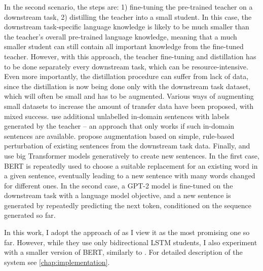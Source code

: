 \documentclass[bsc,frontabs,twoside,singlespacing,parskip,deptreport]{infthesis}
\begin{document}
{{{      In the second scenario, the steps are: 1) fine-tuning the pre-trained teacher on a downstream task, 2) distilling the teacher into a small student. 
      In this case, the downstream task-specific language knowledge is likely to be much smaller than the teacher's overall pre-trained language knowledge, meaning that a much smaller student can still contain all important knowledge from the fine-tuned teacher. 
      However, with this approach, the teacher fine-tuning and distillation has to be done separately every downstream task, which can be resource-intensive.
      Even more importantly, the distillation procedure can suffer from lack of data, since the distillation is now being done only with the downstream task dataset, which will often be small and has to be augmented.
      Various ways of augmenting small datasets to increase the amount of transfer data have been proposed, with mixed success. 
      \citet{Mukherjee_2019} use additional unlabelled in-domain sentences with labels generated by the teacher -- an approach that only works if such in-domain sentences are available. \citet{Tang_2019a} propose augmentation based on simple, rule-based perturbation of existing sentences from the downstream task data. Finally, \citet{Jiao_2019} and \citet{Tang_2019b} use big Transformer models generatively to create new sentences. In the first case, BERT is repeatedly used to choose a suitable replacement for an existing word in a given sentence, eventually leading to a new sentence with many words changed for different ones. In the second case, a GPT-2 model is fine-tuned on the downstream task with a language model objective, and a new sentence is generated by repeatedly predicting the next token, conditioned on the sequence generated so far.

      In this work, I adopt the approach of \citet{Tang_2019b} as I view it as the most promising one so far. However, while they use only bidirectional LSTM students, I also experiment with a smaller version of BERT, similarly to \citet{Jiao_2019}. For detailed description of the system see \autoref{chap:implementation}.
    }
  }
  
}
\end{document}
